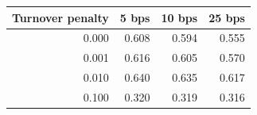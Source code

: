 \begin{tabular}{rrrr}
\toprule
Turnover penalty & 5 bps & 10 bps & 25 bps \\
\midrule
0.000 & 0.608 & 0.594 & 0.555 \\
0.001 & 0.616 & 0.605 & 0.570 \\
0.010 & 0.640 & 0.635 & 0.617 \\
0.100 & 0.320 & 0.319 & 0.316 \\
\bottomrule
\end{tabular}

